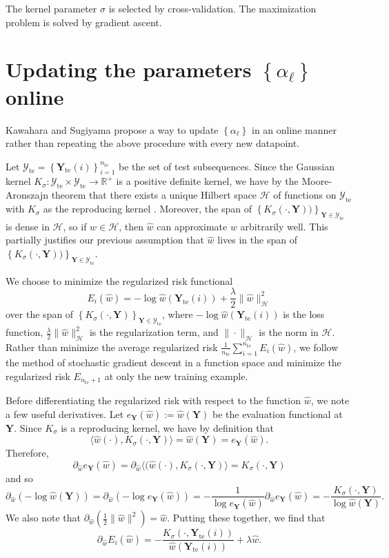 \documentclass[12pt]{article}
\newcommand\prn[1]{\left( #1 \right)}
\newcommand\set[1]{\left\{ #1 \right\}}
\newcommand\RR{\mathbb{R}}
\newcommand\YY{{\boldsymbol{Y}}}
\newcommand\YYY{\mathcal{Y}}
\newcommand\HH{\mathcal{H}}
\newcommand\te{{\mathrm{te}}}
\begin{document}
The kernel parameter $\sigma$ is selected by cross-validation. The maximization problem is solved by gradient ascent.

\section{Updating the parameters $\set{\alpha_\ell}$ online}

Kawahara and Sugiyama propose a way to update $\set{\alpha_\ell}$ in an online manner rather than repeating the above procedure with every new datapoint.

Let $\YYY_\te=\set{\YY_\te(i)}_{i=1}^{n_\te}$ be the set of test subsequences. Since the Gaussian kernel $K_\sigma\colon\YYY_\te\times\YYY_\te\to\RR^+$ is a positive definite kernel, we have by the Moore-Aronszajn theorem that there exists a unique Hilbert space $\HH$ of functions on $\YYY_\te$ with $K_\sigma$ as the reproducing kernel \cite{berlinet2004reproducing}. Moreover, the span of $\set{K_\sigma(\cdot,\YY))}_{\YY\in\YYY_\te}$ is dense in $\HH$, so if $w\in\HH$, then $\hat w$ can approximate $w$ arbitrarily well. This partially justifies our previous assumption that $\hat w$ lives in the span of $\set{K_\sigma(\cdot,\YY))}_{\YY\in\YYY_\te}$. 

We choose to minimize the regularized risk functional
$$E_i(\hat w)=-\log\hat w(\YY_\te(i))+\frac{\lambda}{2}\|\hat w\|_\HH^2$$
over the span of $\set{K_\sigma(\cdot,\YY)}_{\YY\in\YYY_\te}$, where $-\log\hat w(\YY_\te(i))$ is the loss function, $\frac\lambda2\|\hat w\|_\HH^2$ is the regularization term, and $\|\cdot\|_\HH$ is the norm in $\HH$. Rather than minimize the average regularized risk $\frac{1}{n_\te}\sum_{i=1}^{n_\te}E_i(\hat w)$, we follow the method of stochastic gradient descent in a function space \cite{kivinen2001online} and minimize the regularized risk $E_{n_\te+1}$ at only the new training example.

Before differentiating the regularized risk with respect to the function $\hat w$, we note a few useful derivatives. Let $e_\YY(\hat w):=\hat w(\YY)$ be the evaluation functional at $\YY$. Since $K_\sigma$ is a reproducing kernel, we have by definition that
$$\langle\hat w(\cdot),K_\sigma(\cdot,\YY)\rangle=\hat w(\YY)=e_\YY(\hat w).$$
Therefore,
$$\partial_{\hat w}e_\YY(\hat w)=\partial_{\hat w}\langle(\hat w(\cdot),K_\sigma(\cdot,\YY)\rangle=K_\sigma(\cdot,\YY)$$
and so
$$\partial_{\hat w}\prn{-\log\hat w(\YY)}
=\partial_{\hat w}\prn{-\log e_\YY(\hat w)}
=-\frac{1}{\log e_\YY(\hat w)}\partial_{\hat w}e_\YY(\hat w)
=-\frac{K_\sigma(\cdot,\YY)}{\log \hat w(\YY)}.
$$
We also note that
$\partial_{\hat w}\prn{\frac12\|\hat w\|^2}=\hat w.$
Putting these together, we find that
$$\partial_{\hat w}E_i(\hat w)=-\frac{K_\sigma(\cdot,\YY_\te(i))}{\hat w(\YY_\te(i))}+\lambda\hat w.$$
\end{document}
